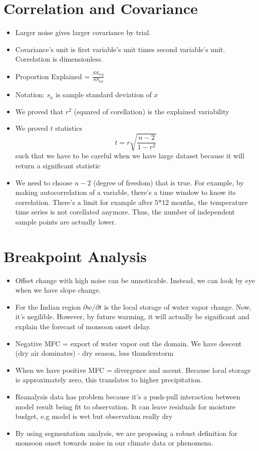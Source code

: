 \documentclass{article}
\begin{document}
\section{Correlation and Covariance}
\begin{itemize}
    \item Larger noise gives larger covariance by trial.
    \item Covariance's unit is first variable's unit times second variable's unit. Correlation is dimensionless.
    \item Proportion Explained = $\frac{SS_{reg}}{SS_{tot}}$
    \item Notation: $s_x$ is sample standard deviation of $x$
    \item We proved that $r^2$ (squared of corellation) is the explained variability
    \item We proved $t$ statistics
    \[ t = r \sqrt{\frac{n-2}{1-r^2}} \]
    such that we have to be careful when we have large dataset because it will return a significant statistic
    \item We need to choose $n-2$ (degree of freedom) that is true. For example, by making autocorrelation of a variable, there's a time window to know its correlation. There's a limit for example after 5*12 months, the temperature time series is not corellated anymore. Thus, the number of independent sample points are actually lower.
\end{itemize}

\section{Breakpoint Analysis}
\begin{itemize}
    \item Offset change with high noise can be unnoticable. Instead, we can look by eye when we have slope change.
    \item For the Indian region $\partial w / \partial t$ is the local storage of water vapor change. Now, it's negilible. However, by future warming, it will actually be significant and explain the forecast of monsoon onset delay.
    \item Negative MFC = export of water vapor out the domain. We have descent (dry air dominates) - dry season, less thunderstorm
    \item When we have positive MFC = divergence and ascent. Because local storage is approximately zero, this translates to higher precipitation.
    \item Reanalysis data has problem because it's a push-pull interaction between model result being fit to observation. It can leave residuals for moisture budget, e.g model is wet but observation really dry
    \item By using segmentation analysis, we are proposing a robust definition for monsoon onset towards noise in our climate data or phenomena.
\end{itemize}
\end{document}
